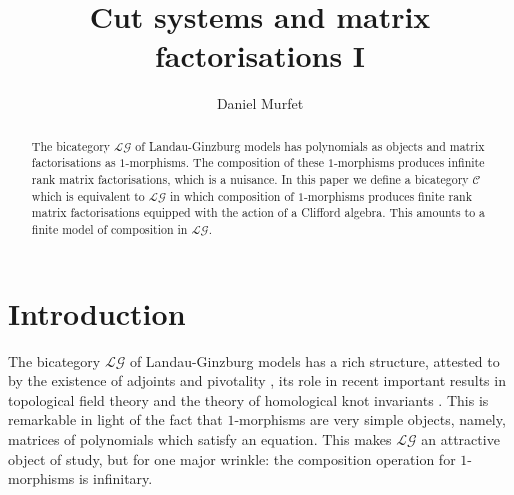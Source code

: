 \documentclass[english,letter paper,12pt,leqno]{article}
\theoremstyle{example}
\numberwithin{equation}{section}
\def\res{\operatorname{Res}}
\def\LG{\mathcal{LG}}
\def\L{\mathcal{C}}
\begin{document}
\def\Res{\res\!}
\newcommand{\ud}{\mathrm{d}}
\newcommand{\Ress}[1]{\res_{#1}\!}
\newcommand{\cat}[1]{\mathcal{#1}}
\newcommand{\lto}{\longrightarrow}
\newcommand{\xlto}[1]{\stackrel{#1}\lto}
\newcommand{\mf}[1]{\mathfrak{#1}}
\newcommand{\md}[1]{\mathscr{#1}}
\def\sus{\l}
\def\l{\,|\,}
\def\sgn{\textup{sgn}}

\title{Cut systems and matrix factorisations I}
\author{Daniel Murfet}


\maketitle

\begin{abstract}
The bicategory $\LG$ of Landau-Ginzburg models has polynomials as objects and matrix factorisations as $1$-morphisms. The composition of these $1$-morphisms produces infinite rank matrix factorisations, which is a nuisance. In this paper we define a bicategory $\L$ which is equivalent to $\LG$ in which composition of $1$-morphisms produces finite rank matrix factorisations equipped with the action of a Clifford algebra. This amounts to a finite model of composition in $\LG$.
\end{abstract}

\tableofcontents

\section{Introduction}

The bicategory $\LG$ of Landau-Ginzburg models has a rich structure, attested to by the existence of adjoints and pivotality \cite{lgdual}, its role in recent important results in topological field theory \cite{genorb,ade} and the theory of homological knot invariants \cite{kr0401268}. This is remarkable in light of the fact that $1$-morphisms are very simple objects, namely, matrices of polynomials which satisfy an equation. This makes $\LG$ an attractive object of study, but for one major wrinkle: the composition operation for $1$-morphisms is infinitary.
\end{document}
